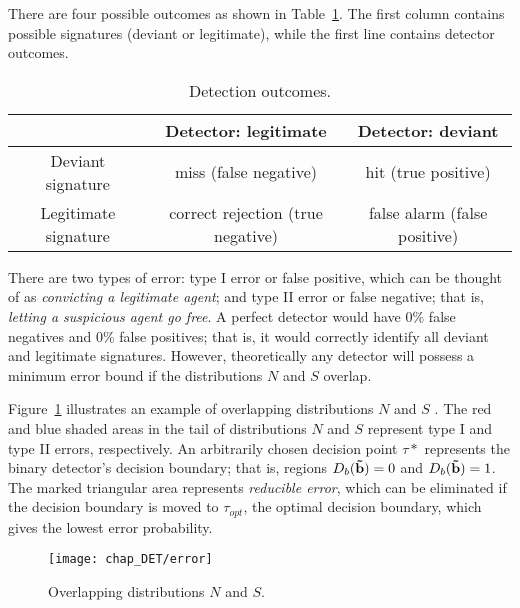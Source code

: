 There are four possible outcomes as shown in Table~\ref{tab:outcome}. The first column contains possible signatures (deviant or legitimate), while the first line contains detector outcomes. 
\begin{table}[!ht]
\centering
\caption{Detection outcomes.}
\renewcommand{\arraystretch}{1.2}
\begin{tabular}{ccc}
\toprule
							& Detector: legitimate					& Detector: deviant					\\
	\hline
	Deviant signature		& miss (false negative)					& hit (true positive)			\\
	Legitimate signature	& correct rejection	(true negative)		& false alarm (false positive)	\\
\toprule
\end{tabular}
\label{tab:outcome}
\end{table}
There are two types of error: type I error or false positive, which can be thought of as \emph{convicting a legitimate agent}; and type II error or false negative; that is, \emph{letting a suspicious agent go free}. A perfect detector would have $0\%$ false negatives and $0\%$ false positives; that is, it would correctly identify all deviant and legitimate signatures. However, theoretically any detector will possess a minimum error bound if the distributions $N$ and $S$ overlap.

Figure~\ref{fig:error} illustrates an example of overlapping distributions $N$ and $S$ \citep{Duda2000}. The red and blue shaded areas in the tail of distributions $N$ and $S$ represent type I and type II errors, respectively. An arbitrarily chosen decision point $\tau*$ represents the binary detector's decision boundary; that is, regions $D_b(\mathbf{\tilde{b}})=0$ and $D_b(\mathbf{\tilde{b}})=1$. The marked triangular area represents \emph{reducible error}, which can be eliminated if the decision boundary is moved to $\tau_{opt}$, the optimal decision boundary, which gives the lowest error probability.

\begin{figure}[!ht]
\centering
\texttt{[image: chap\_DET/error]}
\caption{Overlapping distributions $N$ and $S$.}
\label{fig:error}
\end{figure}


